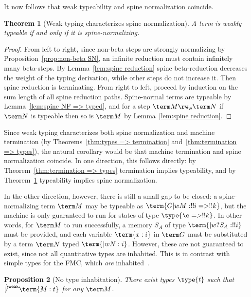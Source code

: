 \documentclass[10pt,a4paper]{amsart}
\newtheorem{theorem}{Theorem}
\newtheorem{proposition}[theorem]{Proposition}
\newcommand\notdashweak{\makebox[3pt][l]{$\not{\kern-2pt{\vdash}}$}\raisebox{5pt}{$\scriptstyle\weak$}}
\newcommand\spine{\mathsf w}
\begin{document}
It now follows that weak typeability and spine normalization coincide.


\begin{theorem}[Weak typing characterizes spine normalization]
\label{thm:types <=> spine}
A term is weakly typeable if and only if it is spine-normalizing.
\end{theorem}

\begin{proof}
From left to right, since non-beta steps are strongly normalizing by Proposition~\ref{prop:non-beta SN}, an infinite reduction must contain infinitely many beta-steps. By Lemma~\ref{lem:spine reduction} spine beta-reduction decreases the weight of the typing derivation, while other steps do not increase it. Then spine reduction is terminating. From right to left, proceed by induction on the sum length of all spine reduction paths. Spine-normal terms are typeable by Lemma~\ref{lem:spine NF => typed}, and for a step $\term M\rw_\spine\term N$ if $\term N$ is typeable then so is $\term M$ by Lemma~\ref{lem:spine reduction}.
\end{proof}

Since weak typing characterizes both spine normalization and machine termination (by Theorems~\ref{thm:types => termination} and~\ref{thm:termination => types}), the natural corollary would be that machine termination and spine normalization coincide. In one direction, this follows directly: by Theorem~\ref{thm:termination => types} termination implies typeability, and by Theorem~\ref{thm:types <=> spine} typeability implies spine normalization.

In the other direction, however, there is still a small gap to be closed: a spine-normalizing term $\term M$ may be typeable as $\term{G |w M: !!i => !!k}$, but the machine is only guaranteed to run for states of type $\type{\e => !!k}$. In other words, for $\term M$ to run successfully, a memory $S_A$ of type $\term{|w ?{S_A}:!!i}$ must be provided, and each variable $\term{x:i}$ in $\term G$ must be substituted by a term $\term N$ typed $\term{|w N:i}$. However, these are not guaranteed to exist, since not all quantitative types are inhabited. This is in contrast with simple types for the FMC, which \emph{are} inhabited~\cite[Remark 3.7]{Heijltjes-2022}.



\begin{proposition}[No type inhabitation]
There exist types $\type{t}$ such that $\notdashweak\term{M:t}$ for any $\term M$.
\end{proposition}
\end{document}
